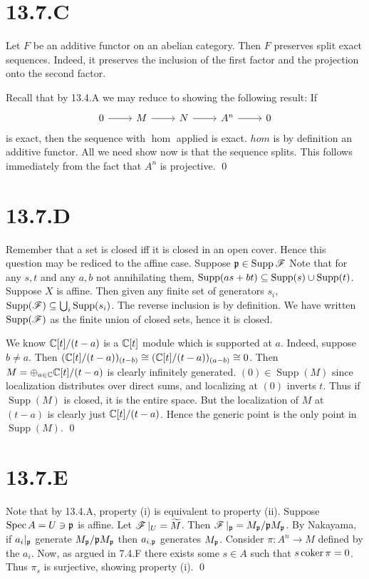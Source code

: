 \documentclass{article}
\begin{document}
\section*{13.7.C}
Let $F$ be an additive functor on an abelian category. Then
$F$ preserves split exact sequences. Indeed, it preserves
the inclusion of the first factor and the projection onto the second factor.

Recall that by 13.4.A we may reduce to showing the following result: If
\[\begin{tikzcd}
        0 & M & N & {A^n} & 0
        \arrow[from=1-1, to=1-2]
        \arrow[from=1-2, to=1-3]
        \arrow[from=1-3, to=1-4]
        \arrow[from=1-4, to=1-5]
    \end{tikzcd}\] is exact, then the sequence with
$\hom$ applied is exact. $hom$ is by
definition an additive functor. All we need show now is that the sequence
splits. This follows immediately from the fact that $A^n$ is
projective. \qed

\section*{13.7.D}
Remember that a set is closed iff it is closed in an open cover. Hence this
question may be rediced to the affine case. Suppose $\mathfrak{p} \in \operatorname{Supp} \operatorname{\mathscr{F}}$
Note that for any $s, t$ and any $a, b$ not
annihilating them, $\operatorname{Supp}(as+bt) \subseteq \operatorname{Supp}(s) \cup
    \operatorname{Supp}(t)$. Suppose $X$ is
affine. Then given any finite set of generators $s_i$,
$\operatorname{Supp}(\operatorname{\mathscr{F}}) \subseteq \bigcup_i \operatorname{Supp}(s_i)$. The reverse inclusion is by definition. We have
written $\operatorname{Supp}(\operatorname{\mathscr{F}})$ as the finite union of closed sets, hence it is
closed.

We know $\mathbb{C}[t]/(t-a)$ is a $\mathbb{C}[t]$ module which is
supported at $a$. Indeed, suppose $b \neq a$.
Then $(\mathbb{C}[t]/(t-a))_{(t-b)} \cong
    (\mathbb{C}[t]/(t-a))_{(a-b)} \cong 0$. Then $M=\oplus_{a \in \mathbb{C}} \mathbb{C}[t]/(t-a)$ is clearly
infinitely generated. $(0) \in \operatorname{Supp}(M)$ since localization distributes
over direct sums, and localizing at $(0)$ inverts
$t$. Thus if $\operatorname{Supp}(M)$ is closed, it is the
entire space. But the localization of $M$ at
$(t-a)$ is clearly just $\mathbb{C}[t]/(t-a)$. Hence the
generic point is the only point in $\operatorname{Supp}(M)$. \qed

\section*{13.7.E}
Note that by 13.4.A, property (i) is equivalent to property (ii). Suppose
$\operatorname{Spec} A\\ = U \ni \mathfrak{p}$ is affine. Let $\operatorname{\mathscr{F}}|_U=\widetilde{M}$. Then
$\operatorname{\mathscr{F}}|_{\mathfrak{p}}=M_{\mathfrak{p}}/\mathfrak{p} M_{\mathfrak{p}}$. By Nakayama, if $a_i|_{\mathfrak{p}}$ generate
$M_{\mathfrak{p}}/\mathfrak{p} M_{\mathfrak{p}}$ then $a_{i, \mathfrak{p}}$ generates
$M_{\mathfrak{p}}$. Consider $\pi: A^n \to M$ defined by the
$a_i$. Now, as argued in 7.4.F there exists some
$s \in A$ such that $s \operatorname{coker} \pi=0$. Thus
$\pi_s$ is surjective, showing property (i). \qed
\end{document}
